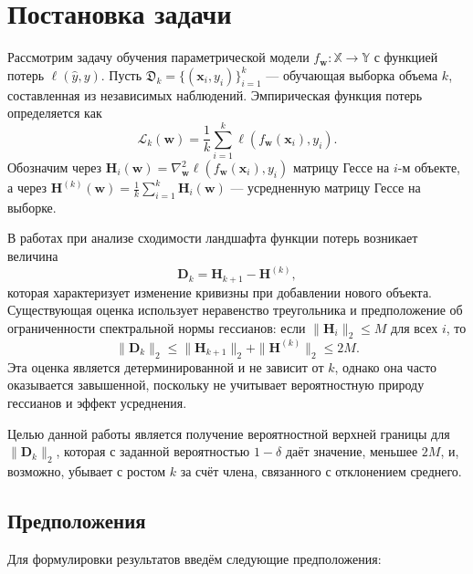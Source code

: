 \documentclass[11pt]{extarticle}
\begin{document}
\section{Постановка задачи}

Рассмотрим задачу обучения параметрической модели \(f_{\mathbf{w}}: \mathbb{X} \to \mathbb{Y}\) с функцией потерь \(\ell(\hat{y}, y)\). Пусть \(\mathfrak{D}_k = \{(\mathbf{x}_i, y_i)\}_{i=1}^k\) — обучающая выборка объема \(k\), составленная из независимых наблюдений. Эмпирическая функция потерь определяется как
\[
\mathcal{L}_k(\mathbf{w}) = \frac{1}{k}\sum_{i=1}^k \ell(f_{\mathbf{w}}(\mathbf{x}_i), y_i).
\]
Обозначим через \(\mathbf{H}_i(\mathbf{w}) = \nabla^2_{\mathbf{w}} \ell(f_{\mathbf{w}}(\mathbf{x}_i), y_i)\) матрицу Гессе на \(i\)-м объекте, а через \(\mathbf{H}^{(k)}(\mathbf{w}) = \frac{1}{k}\sum_{i=1}^k \mathbf{H}_i(\mathbf{w})\) — усредненную матрицу Гессе на выборке.

В работах \cite{Kiselev2024, Meshkov2024} при анализе сходимости ландшафта функции потерь возникает величина
\[
\mathbf{D}_k = \mathbf{H}_{k+1} - \mathbf{H}^{(k)},
\]
которая характеризует изменение кривизны при добавлении нового объекта. Существующая оценка использует неравенство треугольника и предположение об ограниченности спектральной нормы гессианов: если \(\|\mathbf{H}_i\|_2 \le M\) для всех \(i\), то
\[
\|\mathbf{D}_k\|_2 \le \|\mathbf{H}_{k+1}\|_2 + \|\mathbf{H}^{(k)}\|_2 \le 2M.
\]
Эта оценка является детерминированной и не зависит от \(k\), однако она часто оказывается завышенной, поскольку не учитывает вероятностную природу гессианов и эффект усреднения.

Целью данной работы является получение вероятностной верхней границы для \(\|\mathbf{D}_k\|_2\), которая с заданной вероятностью \(1-\delta\) даёт значение, меньшее \(2M\), и, возможно, убывает с ростом \(k\) за счёт члена, связанного с отклонением среднего.

\subsection{Предположения}

Для формулировки результатов введём следующие предположения:
\end{document}
